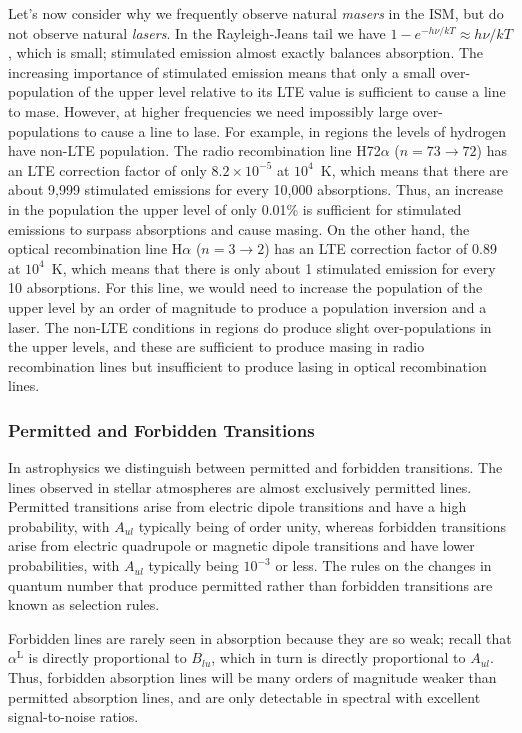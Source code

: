 Let’s now consider why we frequently observe natural \emph{masers} in the ISM, but do not observe natural \emph{lasers}.
In the Rayleigh-Jeans tail we have $1 - e^{-h\nu/kT} \approx
h\nu/kT$, which is small; stimulated emission almost exactly
balances absorption. The increasing importance of stimulated
emission means that only a small
over-population of the upper level relative to its LTE value
is sufficient to cause a line to mase. However, at higher frequencies we need impossibly large over-populations to cause a line to lase.
For example, in
 regions the levels of hydrogen have non-LTE
population. The radio recombination line H72$\alpha$
($n=73\rightarrow72$) has an LTE correction factor of only $8.2\times10^{-5}$ at $10^4$~K, which means that there are about 9,999 stimulated emissions for every 10,000 absorptions. Thus, an increase in the population the upper level of only 0.01\% is sufficient for stimulated emissions to surpass absorptions and cause masing. On the other hand, the optical recombination line H$\alpha$ ($n=3\rightarrow2$) has an LTE correction factor of 0.89 at $10^4$~K, which means that there is only about 1 stimulated emission for every 10 absorptions. For this line, we would need to increase the population of the upper level by an order of magnitude to produce a population inversion and a laser. The non-LTE conditions in  regions do produce slight over-populations in the upper levels, and these are sufficient to produce masing in radio recombination lines but insufficient to produce lasing in optical recombination lines.

\subsubsection{Permitted and Forbidden Transitions}

In astrophysics we distinguish between permitted and
forbidden transitions. The lines observed in stellar
atmospheres are almost exclusively permitted lines.
Permitted transitions arise from electric dipole transitions
and have a high probability, with $A_{ul}$ typically being of order unity, whereas forbidden transitions arise from electric
quadrupole or magnetic dipole transitions and have lower
probabilities, with $A_{ul}$ typically being $10^{-3}$ or less. 
The rules on the changes in quantum
number that produce permitted rather than forbidden
transitions are known as selection rules.

Forbidden lines are rarely seen in absorption because they are so weak;
recall that $\alpha^\mathrm{L}$ is directly proportional to $B_{lu}$,
which in turn is directly proportional to $A_{ul}$. Thus, forbidden
absorption lines will be many orders of magnitude weaker than permitted
absorption lines, and are only detectable in spectral with excellent signal-to-noise
ratios.

